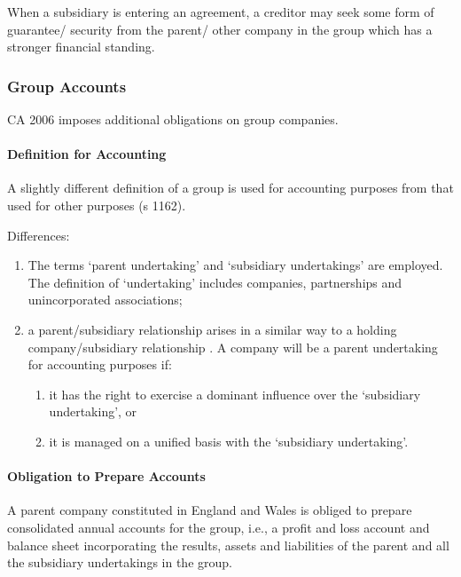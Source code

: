 \documentclass[
]{article}
\providecommand{\tightlist}{%
  \setlength{\itemsep}{0pt}\setlength{\parskip}{0pt}}
\begin{document}
When a subsidiary is entering an agreement, a creditor may seek some
form of guarantee/ security from the parent/ other company in the group
which has a stronger financial standing.

\hypertarget{group-accounts}{%
\subsubsection{Group Accounts}\label{group-accounts}}

CA 2006 imposes additional obligations on group companies.

\hypertarget{definition-for-accounting}{%
\paragraph{Definition for Accounting}\label{definition-for-accounting}}

A slightly different definition of a group is used for accounting
purposes from that used for other purposes (s 1162).

Differences:

\begin{enumerate}
\def\labelenumi{\arabic{enumi}.}
\tightlist
\item
  The terms `parent undertaking' and `subsidiary undertakings' are
  employed. The definition of `undertaking' includes companies,
  partnerships and unincorporated associations;
\item
  a parent/subsidiary relationship arises in a similar way to a holding
  company/subsidiary relationship . A company will be a parent
  undertaking for accounting purposes if:

  \begin{enumerate}
  \def\labelenumii{\arabic{enumii}.}
  \tightlist
  \item
    it has the right to exercise a dominant influence over the
    `subsidiary undertaking', or
  \item
    it is managed on a unified basis with the `subsidiary undertaking'.
  \end{enumerate}
\end{enumerate}

\hypertarget{obligation-to-prepare-accounts}{%
\paragraph{Obligation to Prepare
Accounts}\label{obligation-to-prepare-accounts}}

A parent company constituted in England and Wales is obliged to prepare
consolidated annual accounts for the group, i.e., a profit and loss
account and balance sheet incorporating the results, assets and
liabilities of the parent and all the subsidiary undertakings in the
group.
\end{document}
